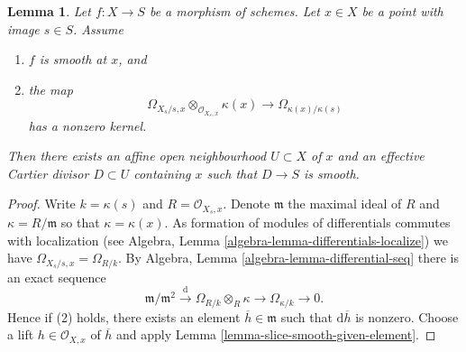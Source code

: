 \documentclass[10pt,a4paper]{amsart}
\theoremstyle{plain}
\newtheorem{lemma}[subsection]{Lemma}
\theoremstyle{definition}
\theoremstyle{remark}
\numberwithin{equation}{subsection}
\begin{document}
\begin{lemma}
\label{lemma-slice-smooth-once}
Let $f : X \to S$ be a morphism of schemes.
Let $x \in X$ be a point with image $s \in S$.
Assume
\begin{enumerate}
\item $f$ is smooth at $x$, and
\item the map
$$
\Omega_{X_s/s, x} \otimes_{\mathcal{O}_{X_s, x}} \kappa(x)
\longrightarrow
\Omega_{\kappa(x)/\kappa(s)}
$$
has a nonzero kernel.
\end{enumerate}
Then there exists an affine open neighbourhood $U \subset X$ of $x$
and an effective Cartier divisor $D \subset U$ containing $x$ such that
$D \to S$ is smooth.
\end{lemma}

\begin{proof}
Write $k = \kappa(s)$ and $R = \mathcal{O}_{X_s, x}$.
Denote $\mathfrak m$ the maximal ideal of $R$ and
$\kappa = R/\mathfrak m$ so that $\kappa = \kappa(x)$.
As formation of modules of differentials commutes with localization (see
Algebra, Lemma \ref{algebra-lemma-differentials-localize})
we have $\Omega_{X_s/s, x} = \Omega_{R/k}$. By
Algebra, Lemma \ref{algebra-lemma-differential-seq}
there is an exact sequence
$$
\mathfrak m/\mathfrak m^2 \xrightarrow{\text{d}}
\Omega_{R/k} \otimes_R \kappa \to
\Omega_{\kappa/k} \to 0.
$$
Hence if (2) holds, there exists an element $\overline{h} \in \mathfrak m$
such that $\text{d}\overline{h}$ is nonzero. Choose a lift
$h \in \mathcal{O}_{X, x}$ of $\overline{h}$ and apply
Lemma \ref{lemma-slice-smooth-given-element}.
\end{proof}
\end{document}
